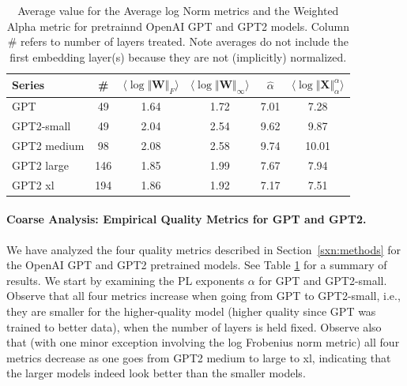 \begin{table}[t]
\small
\begin{center}
\begin{tabular}{|p{0.75in}|c|c|c|c|c|}
\hline
 Series  & \#   & $\langle\log\Vert\mathbf{W}\Vert_{F}\rangle$ & $\langle\log\Vert\mathbf{W}\Vert_{\infty}\rangle$ & $\hat{\alpha}$ & $\langle\log\Vert\mathbf{X}\Vert^{\alpha}_{\alpha}\rangle$ \\
\hline
GPT & 49 & 1.64  & 1.72 & 7.01 & 7.28 \\
GPT2-small & 49 & 2.04  & 2.54& 9.62 & 9.87 \\
\hline
GPT2 medium & 98 & 2.08 & 2.58& 9.74 & 10.01 \\
GPT2 large & 146 & 1.85 & 1.99& 7.67 & 7.94 \\
GPT2 xl & 194 & 1.86 & 1.92 & 7.17 & 7.51 \\
\hline
\end{tabular}
\end{center}
\caption{Average value for the Average log Norm metrics and the Weighted Alpha metric for pretrainnd OpenAI GPT and GPT2 models. Column \# refers to number of layers treated.  Note averages do not include the first embedding layer(s) because they are not (implicitly) normalized.  }
\label{table:nlp}
\end{table}


\paragraph{Coarse Analysis: Empirical Quality Metrics for GPT and GPT2.}

We have analyzed the four quality metrics described in Section~\ref{sxn:methods} for the OpenAI GPT and GPT2 pretrained models.
See Table \ref{table:nlp} for a summary of results.
We start by examining the PL exponents $\alpha$ for GPT and GPT2-small.
Observe that all four metrics increase when going from GPT to GPT2-small, i.e., they are smaller for the higher-quality model (higher quality since GPT was trained to better data), when the number of layers is held fixed.
Observe also that (with one minor exception involving the log Frobenius norm metric) all four metrics decrease as one goes from GPT2 medium to large to xl, indicating that the larger models indeed look better than the smaller models.

